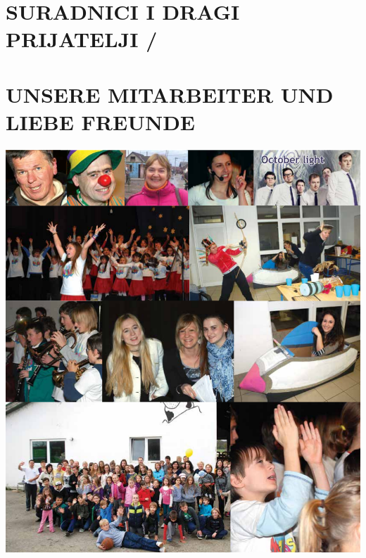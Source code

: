 \documentclass[a4paper,twoside, svgnames]{article}
\begin{document}
\newpage

\section*{SURADNICI I DRAGI PRIJATELJI /}
\section*{UNSERE MITARBEITER UND LIEBE FREUNDE}
\begin{center}
\vspace{1cm}
\includegraphics[width=1\linewidth]{images/suradnici}\\
\end{center}
\end{document}
